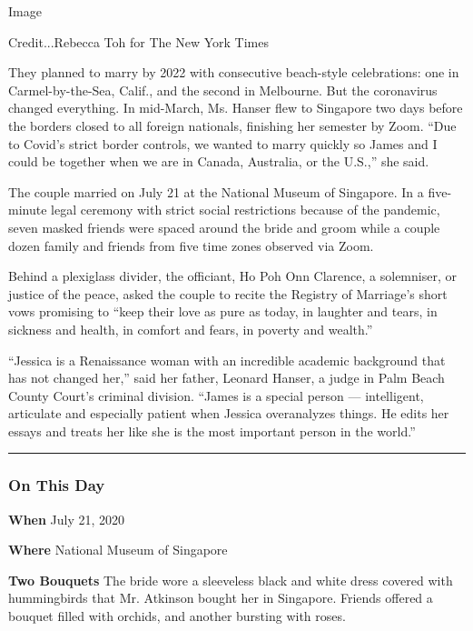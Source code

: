 Image

Credit...Rebecca Toh for The New York Times

They planned to marry by 2022 with consecutive beach-style celebrations:
one in Carmel-by-the-Sea, Calif., and the second in Melbourne. But the
coronavirus changed everything. In mid-March, Ms. Hanser flew to
Singapore two days before the borders closed to all foreign nationals,
finishing her semester by Zoom. ``Due to Covid's strict border controls,
we wanted to marry quickly so James and I could be together when we are
in Canada, Australia, or the U.S.,'' she said.

The couple married on July 21 at the National Museum of Singapore. In a
five-minute legal ceremony with strict social restrictions because of
the pandemic, seven masked friends were spaced around the bride and
groom while a couple dozen family and friends from five time zones
observed via Zoom.

Behind a plexiglass divider, the officiant, Ho Poh Onn Clarence, a
solemniser, or justice of the peace, asked the couple to recite the
Registry of Marriage's short vows promising to ``keep their love as pure
as today, in laughter and tears, in sickness and health, in comfort and
fears, in poverty and wealth.''

``Jessica is a Renaissance woman with an incredible academic background
that has not changed her,'' said her father, Leonard Hanser, a judge in
Palm Beach County Court's criminal division. ``James is a special person
--- intelligent, articulate and especially patient when Jessica
overanalyzes things. He edits her essays and treats her like she is the
most important person in the world.''

\begin{center}\rule{0.5\linewidth}{\linethickness}\end{center}

\hypertarget{on-this-day}{%
\subsubsection{On This Day}\label{on-this-day}}

\textbf{When} July 21, 2020

\textbf{Where} National Museum of Singapore

\textbf{Two Bouquets} The bride wore a sleeveless black and white dress
covered with hummingbirds that Mr. Atkinson bought her in Singapore.
Friends offered a bouquet filled with orchids, and another bursting with
roses.

